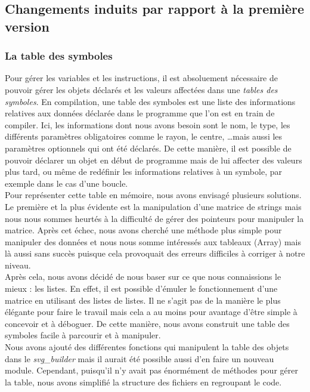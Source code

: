 		\subsection{Changements induits par rapport à la première version}
			\subsubsection{La table des symboles}
			Pour gérer les variables et les instructions, il est absoluement nécessaire de pouvoir gérer les objets déclarés et les valeurs affectées dans une \emph{tables des symboles}. En compilation, une table des symboles est une liste des informations relatives aux données déclarée dans le programme que l'on est en train de compiler. Ici, les informations dont nous avons besoin sont le nom, le type, les différents paramètres obligatoires comme le rayon, le centre, \dots mais aussi les paramètres optionnels qui ont été déclarés. De cette manière, il est possible de pouvoir déclarer un objet en début de programme mais de lui affecter des valeurs plus tard, ou même de redéfinir les informations relatives à un symbole, par exemple dans le cas d'une boucle. \\
			
			Pour représenter cette table en mémoire, nous avons envisagé plusieurs solutions. Le première et la plus évidente est la manipulation d'une matrice de strings mais nous nous sommes heurtés à la difficulté de gérer des pointeurs pour manipuler la matrice. Après cet échec, nous avons cherché une méthode plus simple pour manipuler des données et nous nous somme intéressés aux tableaux (Array) mais là aussi sans succès puisque cela provoquait des erreurs difficiles à corriger à notre niveau. \\
			
			Après cela, nous avons décidé de nous baser sur ce que nous connaissions le mieux : les listes. En effet, il est possible d'émuler le fonctionnement d'une matrice en utilisant des listes de listes. Il ne s'agit pas de la manière le plus élégante pour faire le travail mais cela a au moins pour avantage d'être simple à concevoir et à déboguer. De cette manière, nous avons construit une table des symboles facile à parcourir et à manipuler. \\
			
			Nous avons ajouté des différentes fonctions qui manipulent la table des objets dans le \emph{svg\_builder} mais il aurait été possible aussi d'en faire un nouveau module. Cependant, puisqu'il n'y avait pas énormément de méthodes pour gérer la table, nous avons simplifié la structure des fichiers en regroupant le code.
			
